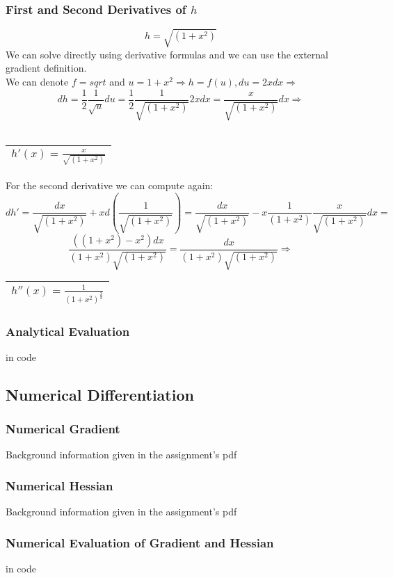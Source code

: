 \documentclass{article}
\newcommand{\rectres}[1]{
\begin{center}
\begin{tabular}{ |c| }
\hline
 #1\\
\hline
\end{tabular}
\end{center}
}
\begin{document}
\subsubsection{First and Second Derivatives of $h$}
$$h=\sqrt{(1+x^2)}$$
We can solve directly using derivative formulas and we can use the external gradient definition.\\
We can denote $f=sqrt$ and $u=1+x^2 \Rightarrow h=f(u), du=2xdx \Rightarrow$
$$dh=\frac{1}{2}\frac{1}{\sqrt{u}}du=\frac{1}{2}\frac{1}{\sqrt{(1+x^2)}}2xdx=\frac{x}{\sqrt{(1+x^2)}}dx\Rightarrow$$\\
\rectres{$h'(x)=\frac{x}{\sqrt{(1+x^2)}}$}
For the second derivative we can compute again:\\
$$dh'=\frac{dx}{\sqrt{(1+x^2)}}+xd(\frac{1}{\sqrt{(1+x^2)}})=\frac{dx}{\sqrt{(1+x^2)}}-x\frac{1}{(1+x^2)}\frac{x}{\sqrt{(1+x^2)}}dx=$$
$$\frac{((1+x^2)-x^2)dx}{(1+x^2)\sqrt{(1+x^2)}}=\frac{dx}{(1+x^2)\sqrt{(1+x^2)}} \Rightarrow$$
\rectres{$h''(x)=\frac{1}{(1+x^2)^{\frac{3}{2}}}$}

\subsubsection{Analytical Evaluation}
in code

\subsection{Numerical Differentiation}
\subsubsection{Numerical Gradient}
Background information given in the assignment's pdf
\subsubsection{Numerical Hessian}
Background information given in the assignment's pdf
\subsubsection{Numerical Evaluation of Gradient and Hessian}
in code

\newpage
\end{document}

